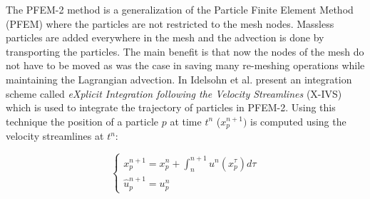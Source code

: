 The PFEM-2 method is a generalization of the Particle Finite Element Method (PFEM) \cite{sergio:pfem} where the particles are not restricted to the mesh nodes. Massless particles are added everywhere in the mesh and the advection is done by transporting the particles. The main benefit is that now the nodes of the mesh do not have to be moved as was the case in \cite{sergio:pfem} saving many re-meshing operations while maintaining the Lagrangian advection. In \cite{sergio:xivs1} Idelsohn et al. present an integration scheme called {\em eXplicit Integration following the Velocity Streamlines} (X-IVS) which is used to integrate the trajectory of particles in PFEM-2. Using this technique the position of a particle $p$ at time $t^n$ ($x_p^{n+1})$ is computed using the velocity streamlines at $t^n$:

\begin{equation}
  \begin{cases}
    x_p^{n+1}=x_p^n+\int_n^{n+1} u^n(x_p^\tau) d\tau\\
    \hat{u}^{n+1}_p=u_p^n
  \end{cases}
\end{equation}
